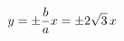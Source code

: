 \documentclass[preview]{standalone}
\begin{document}
\begin{align*}
\special{dvisvgm:raw <g id='unique000'>}y=\pm \frac{b}{a}x = \pm 2\sqrt{3}\,x\special{dvisvgm:raw </g>}
\end{align*}
\end{document}
